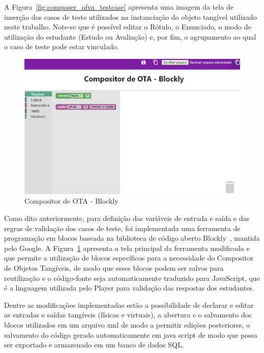 A Figura~\ref{fig:composer_ofva_testcase} apresenta uma imagem da tela de inserção dos casos de teste utilizados na instanciação do objeto tangível utilizado neste trabalho. Note-se que é possível editar o Rótulo, o Enunciado, o modo de utilização do estudante (Estudo ou Avaliação) e, por fim, o agrupamento ao qual o caso de teste pode estar vinculado.

 \begin{figure}[htb]
	\centering
	\includegraphics[width=0.95\linewidth]{chapters/proposedMethod/tools/blockly_ota}
	\caption{Compositor de OTA - Blockly}
	\label{fig:composer_ofvablockly}
\end{figure}

Como dito anteriormente, para definição das variáveis de entrada e saída e das regras de validação dos casos de teste, foi implementada uma ferramenta de programação em blocos baseada na biblioteca de código aberto Blockly~\citep{Blockly:2022}, mantida pelo Google. A Figura~\ref{fig:composer_ofvablockly} apresenta a tela principal da ferramenta modificada e que permite a utilização de blocos específicos para a necessidade do Compositor de Objetos Tangíveis, de modo que esses blocos podem ser salvos para reutilização e o código-fonte seja automaticamente traduzido para JavaScript, que é a linguagem utilizada pelo Player para validação das respostas dos estudantes.

Dentre as modificações implementadas estão a possibilidade de declarar e editar as entradas e saídas tangíveis (físicas e virtuais), a abertura e o salvamento dos blocos utilizados em um arquivo xml de modo a permitir edições posteriores, o salvamento do código gerado automaticamente em java script de modo que possa ser exportado e armazenado em um banco de dados SQL.

